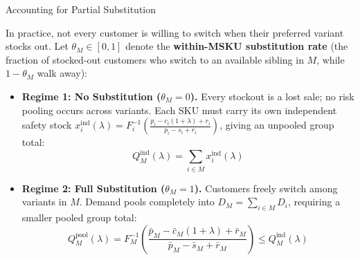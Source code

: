 \documentclass[11pt]{beamer}
\begin{document}
\begin{frame}[allowframebreaks]{Accounting for Partial Substitution}
\begin{small}
In practice, not every customer is willing to switch when their preferred variant stocks out. Let $\theta_M \in [0, 1]$ denote the \textbf{within-MSKU substitution rate} (the fraction of stocked-out customers who switch to an available sibling in $M$, while $1 - \theta_M$ walk away):

\begin{itemize}
\item \textbf{Regime 1: No Substitution ($\theta_M = 0$).} Every stockout is a lost sale; no risk pooling occurs across variants. Each SKU must carry its own independent safety stock $x_i^{\text{ind}}(\lambda) = F_i^{-1}\!\left(\frac{p_i - c_i(1+\lambda) + r_i}{p_i - s_i + r_i}\right)$, giving an unpooled group total:
\begin{equation*}
Q_M^{\text{ind}}(\lambda) = \sum_{i \in M} x_i^{\text{ind}}(\lambda)
\end{equation*}
\item \textbf{Regime 2: Full Substitution ($\theta_M = 1$).} Customers freely switch among variants in $M$. Demand pools completely into $D_M = \sum_{i \in M} D_i$, requiring a smaller pooled group total:
\begin{equation*}
Q_M^{\text{pool}}(\lambda) = F_M^{-1}\!\left( \frac{\bar{p}_M - \bar{c}_M (1+\lambda) + \bar{r}_M}{\bar{p}_M - \bar{s}_M + \bar{r}_M} \right) \leq Q_M^{\text{ind}}(\lambda)
\end{equation*}
\end{itemize}
\end{small}


\end{frame}
\end{document}
